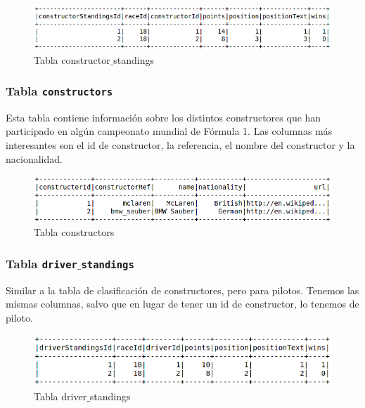 \documentclass[12pt,twoside,titlepage]{report}
\begin{document}
\begin{figure}[H]
  \includegraphics[scale=0.4]{constructor_standings_table.png}
  \centering
  \caption{Tabla constructor$\_$standings}
  \label{fig:constructorstands}
  \centering
\end{figure}

\subsubsection{Tabla \texttt{constructors}}

Esta tabla contiene información sobre los distintos constructores que han participado en algún campeonato mundial de Fórmula 1. Las columnas más interesantes son el id de constructor, la referencia, el nombre del constructor y la nacionalidad. 

\begin{figure}[H]
  \includegraphics[scale=0.4]{constructors_table.png}
  \centering
  \caption{Tabla constructors}
  \label{fig:constructors}
  \centering
\end{figure}


\subsubsection{Tabla \texttt{driver$\_$standings}}

Similar a la tabla de clasificación de constructores, pero para pilotos. Tenemos las mismas columnas, salvo que en lugar de tener un id de constructor, lo tenemos de piloto. 


\begin{figure}[H]
  \includegraphics[scale=0.4]{driver_standings_table.png}
  \centering
  \caption{Tabla driver$\_$standings}
  \label{fig:drivstands}
  \centering
\end{figure}
\end{document}

